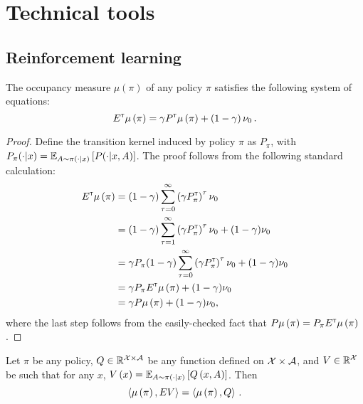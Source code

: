 \section{Technical tools}

\subsection{Reinforcement learning}

\begin{proposition}\label{prop:flow}
  The occupancy measure $\mu(\pi)$ of any policy $\pi$ satisfies the following system of equations:
  \begin{equation}\label{eq:flow}
      E^\mathsf{\scriptscriptstyle T} \mu \left( \pi \right) = \gamma P^\mathsf{\scriptscriptstyle T} \mu \left( \pi \right) + \left( 1 - \gamma \right) \nu_0\,.
  \end{equation}
\end{proposition}

\begin{proof}
  Define the transition kernel induced by policy $\pi$ as $P_\pi$, with $P_\pi(\cdot|x) = \mathbb{E}_{A\sim\pi(\cdot|x)}\left[ P(\cdot|x,A) \right]$. The proof follows from the following standard calculation:
  \begin{align*}
    E^\mathsf{\scriptscriptstyle T} \mu \left( \pi \right) &= (1-\gamma) \sum_{\tau=0}^\infty \left(\gamma P_\pi^\mathsf{\scriptscriptstyle T}\right)^\tau \nu_0 \\
    &= (1-\gamma) \sum_{\tau=1}^\infty \left(\gamma P_\pi^\mathsf{\scriptscriptstyle T}\right)^\tau \nu_0 + (1-\gamma) \nu_0 \\
    &= \gamma P_\pi (1-\gamma) \sum_{\tau=0}^\infty \left(\gamma P_\pi^\mathsf{\scriptscriptstyle T}\right)^\tau \nu_0 + (1-\gamma) \nu_0 \\
    &= \gamma P_\pi E^\mathsf{\scriptscriptstyle T} \mu \left( \pi \right) + (1-\gamma) \nu_0 \\
    &= \gamma P \mu \left( \pi \right) + (1-\gamma) \nu_0,
  \end{align*}
  where the last step follows from the easily-checked fact that $P \mu \left( \pi \right) = P_\pi E^\mathsf{\scriptscriptstyle T} \mu \left( \pi \right)$.
\end{proof}


\begin{lemma}\label{lem:from-ev-to-q}
  Let $\pi$ be any policy, $Q \in \mathbb{R}^{\mathcal{X} \times \mathcal{A}}$ be any function defined on $\mathcal{X} \times \mathcal{A}$, and $V \in \mathbb{R}^{\mathcal{X}}$ be such that for any $x$, $V \left( x \right) = \mathbb{E}_{A \sim \pi \left( \cdot \mathrel{}\middle|\mathrel{} x \right)} \left[ Q \left( x, A \right) \right]$. Then
  \begin{equation*}
    \left\langle \mu \left( \pi \right), E V \right\rangle = \left\langle \mu \left( \pi \right), Q \right\rangle\,.
  \end{equation*}
\end{lemma}

